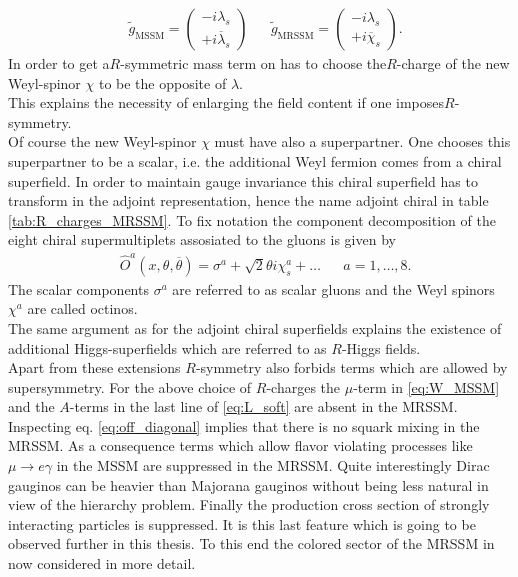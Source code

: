 \begin{align}
& \tilde{g}_\mathrm{MSSM} = \begin{pmatrix}
-i \lambda_s \\
+i \overline{\lambda}_s
\end{pmatrix} && \tilde{g}_\mathrm{MRSSM} = \begin{pmatrix}
-i \lambda_s \\
+i \overline{\chi}_s
\end{pmatrix}.
\end{align}
In order to get a$R$-symmetric mass term on has to choose the$R$-charge of the new Weyl-spinor $\chi$ to be the opposite of $\lambda$.\\
This explains the necessity of enlarging the field content if one imposes$R$-symmetry.\\
Of course the new Weyl-spinor $\chi$ must have also a superpartner. One chooses this superpartner to be a scalar, i.e. the additional Weyl fermion comes from a chiral superfield. In order to maintain gauge invariance this chiral superfield has to transform in the adjoint representation, hence the name adjoint chiral in table \ref{tab:R_charges_MRSSM}. To fix notation the component decomposition of the eight chiral supermultiplets assosiated to the gluons is given by
\begin{align}
&\hat{O}^a(x, \theta, \overline{\theta}) = \sigma^a + \sqrt{2}\theta i\chi^a_s + \hdots && a = 1,\hdots,8.
\end{align}
The scalar components $\sigma^a$ are referred to as scalar gluons and the Weyl spinors $\chi^a$ are called octinos.\\
The same argument as for the adjoint chiral superfields explains the existence of additional Higgs-superfields which are referred to as $R$-Higgs fields.\\
Apart from these extensions $R$-symmetry also forbids terms which are allowed by supersymmetry. For the above choice of $R$-charges the $\mu$-term in \eqref{eq:W_MSSM} and the $A$-terms in the last line of \eqref{eq:L_soft} are absent in the MRSSM. Inspecting eq. \eqref{eq:off_diagonal} implies that there is no squark mixing in the MRSSM. As a consequence terms which allow flavor violating processes like $\mu \to e \gamma$ in the MSSM are suppressed in the MRSSM\cite{Kribs:2007ac}. Quite interestingly Dirac gauginos can be heavier than Majorana gauginos without being less natural in view of the hierarchy problem\cite{Nelson:2002ca, Kribs:2012gx, Hardy:2013ywa}. Finally the production cross section of strongly interacting particles is suppressed\cite{Kribs:2012gx, Kribs:2013oda}. It is this last feature which is going to be observed further in this thesis. To this end the colored sector of the MRSSM in now considered in more detail.


